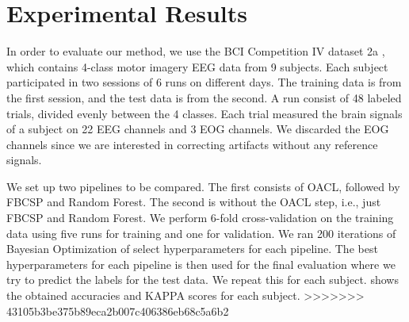 \section{Experimental Results}
In order to evaluate our method, we use the BCI Competition IV dataset 2a \citep{brunner2008bci}, which contains 4-class motor imagery EEG data from 9 subjects. Each subject participated in two sessions of 6 runs on different days. The training data is from the first session, and the test data is from the second. A run consist of 48 labeled trials, divided evenly between the 4 classes. Each trial measured the brain signals of a subject on 22 EEG channels and 3 EOG channels. We discarded the EOG channels since we are interested in correcting artifacts without any reference signals.

We set up two pipelines to be compared. The first consists of OACL, followed by FBCSP and Random Forest. The second is without the OACL step, i.e., just FBCSP and Random Forest. We perform 6-fold cross-validation on the training data using five runs for training and one for validation. We ran 200 iterations of Bayesian Optimization of select hyperparameters for each pipeline. The best hyperparameters for each pipeline is then used for the final evaluation where we try to predict the labels for the test data. We repeat this for each subject.  shows the obtained accuracies and KAPPA scores for each subject.
>>>>>>> 43105b3be375b89eca2b007c406386eb68c5a6b2

